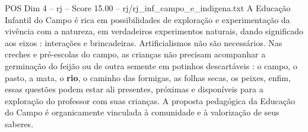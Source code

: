 \begin{textsample}{POS Dim 4 – rj – Score 15.00 – rj/rj\_inf\_campo\_e\_indigena.txt}
A Educação Infantil do Campo é rica em possibilidades de exploração e experimentação da vivência com a natureza, em verdadeiros experimentos naturais, dando significado aos eixos : interações e brincadeiras.
Artificialismos não são necessários.
Nas creches e pré-escolas do campo, as crianças não precisam acompanhar a germinação do feijão ou de outra semente em potinhos descartáveis : o campo, o pasto, a mata, o \textbf{rio}, o caminho das formigas, as folhas secas, os peixes, enfim, essas questões podem estar ali presentes, próximas e disponíveis para a exploração do professor com suas crianças.
A proposta pedagógica da Educação do Campo é organicamente vinculada à comunidade e à valorização de seus saberes.

\end{textsample}
